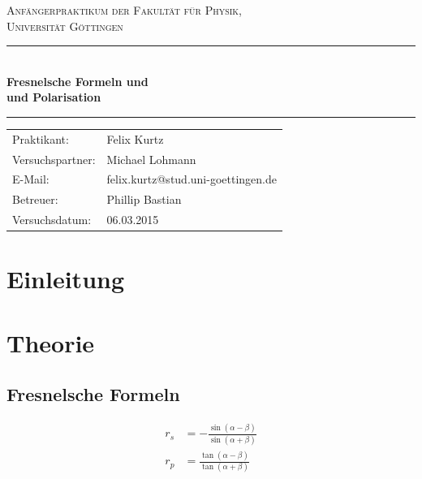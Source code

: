 \documentclass[12pt,a4paper,titlepage,headinclude,bibtotoc]{scrartcl}
\begin{document}
\begin{titlepage}
\centering
\textsc{\Large Anfängerpraktikum der Fakultät für
  Physik,\\[1.5ex] Universität Göttingen}

\vspace*{4.2cm}

\rule{\textwidth}{1pt}\\[0.5cm]
{\huge \bfseries
  Fresnelsche Formeln und\\[1.5ex]
  und Polarisation}\\[0.5cm]
\rule{\textwidth}{1pt}

\vspace*{3.0cm}

\begin{Large}
\begin{tabular}{ll}
Praktikant:
 	&  Felix Kurtz\\
Versuchspartner:
 	&  Michael Lohmann\\

E-Mail: 
	&  felix.kurtz@stud.uni-goettingen.de\\
	
 Betreuer: & Phillip Bastian\\
 Versuchsdatum: &  06.03.2015\\
\end{tabular}
\end{Large}

\vspace*{1.8cm}

\begin{Large}
\end{Large}

\end{titlepage}

\tableofcontents

\newpage

\section{Einleitung}
\label{sec:einleitung}

\section{Theorie}
\label{sec:theorie}
\subsection{Fresnelsche Formeln}
\begin{align}
	r_s&=-\frac{\sin(\alpha-\beta)}{\sin(\alpha+\beta)}\\
	r_p&=\frac{\tan(\alpha-\beta)}{\tan(\alpha+\beta)}
\end{align}
\end{document}
